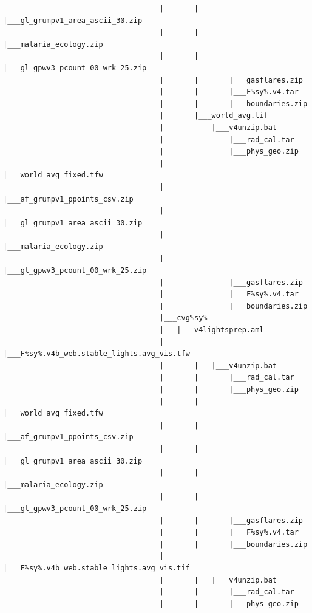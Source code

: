 \documentclass[
]{book}
\begin{document}
\begin{verbatim}
                                    |       |       |___gl_grumpv1_area_ascii_30.zip
                                    |       |       |___malaria_ecology.zip
                                    |       |       |___gl_gpwv3_pcount_00_wrk_25.zip
                                    |       |       |___gasflares.zip
                                    |       |       |___F%sy%.v4.tar
                                    |       |       |___boundaries.zip
                                    |       |___world_avg.tif
                                    |           |___v4unzip.bat
                                    |               |___rad_cal.tar
                                    |               |___phys_geo.zip
                                    |               |___world_avg_fixed.tfw
                                    |               |___af_grumpv1_ppoints_csv.zip
                                    |               |___gl_grumpv1_area_ascii_30.zip
                                    |               |___malaria_ecology.zip
                                    |               |___gl_gpwv3_pcount_00_wrk_25.zip
                                    |               |___gasflares.zip
                                    |               |___F%sy%.v4.tar
                                    |               |___boundaries.zip
                                    |___cvg%sy%
                                    |   |___v4lightsprep.aml
                                    |       |___F%sy%.v4b_web.stable_lights.avg_vis.tfw
                                    |       |   |___v4unzip.bat
                                    |       |       |___rad_cal.tar
                                    |       |       |___phys_geo.zip
                                    |       |       |___world_avg_fixed.tfw
                                    |       |       |___af_grumpv1_ppoints_csv.zip
                                    |       |       |___gl_grumpv1_area_ascii_30.zip
                                    |       |       |___malaria_ecology.zip
                                    |       |       |___gl_gpwv3_pcount_00_wrk_25.zip
                                    |       |       |___gasflares.zip
                                    |       |       |___F%sy%.v4.tar
                                    |       |       |___boundaries.zip
                                    |       |___F%sy%.v4b_web.stable_lights.avg_vis.tif
                                    |       |   |___v4unzip.bat
                                    |       |       |___rad_cal.tar
                                    |       |       |___phys_geo.zip

\end{verbatim}
\end{document}
